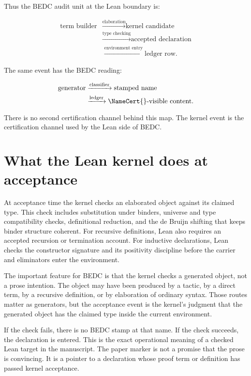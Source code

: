 Thus the BEDC audit unit at the Lean boundary is:

$$
\begin{aligned}
\text{term builder}
&\xrightarrow{\text{elaboration}}
\text{kernel candidate}\\
&\xrightarrow{\text{type checking}}
\text{accepted declaration}\\
&\xrightarrow{\text{environment entry}}
\text{ledger row}.
\end{aligned}
$$

The same event has the BEDC reading:

$$
\begin{aligned}
\text{generator}
&\xrightarrow{\text{classifier}}
\text{stamped name}\\
&\xrightarrow{\text{ledger}}
\NameCert{}\text{-visible content}.
\end{aligned}
$$

There is no second certification channel behind this map. The kernel event is
the certification channel used by the Lean side of BEDC.

\section{What the Lean kernel does at acceptance}
\label{sec:kernel-audit-witness-acceptance}

At acceptance time the kernel checks an elaborated object against its claimed
type. This check includes substitution under binders, universe and type
compatibility checks, definitional reduction, and the de Bruijn shifting that
keeps binder structure coherent. For recursive definitions, Lean also requires
an accepted recursion or termination account. For inductive declarations, Lean
checks the constructor signature and its positivity discipline before the
carrier and eliminators enter the environment.

The important feature for BEDC is that the kernel checks a generated object,
not a prose intention. The object may have been produced by a tactic, by a
direct term, by a recursive definition, or by elaboration of ordinary syntax.
Those routes matter as generators, but the acceptance event is the kernel's
judgment that the generated object has the claimed type inside the current
environment.

If the check fails, there is no BEDC stamp at that name. If the check succeeds,
the declaration is entered. This is the exact operational meaning of a checked
Lean target in the manuscript. The paper marker is not a promise that the prose
is convincing. It is a pointer to a declaration whose proof term or definition
has passed kernel acceptance.

